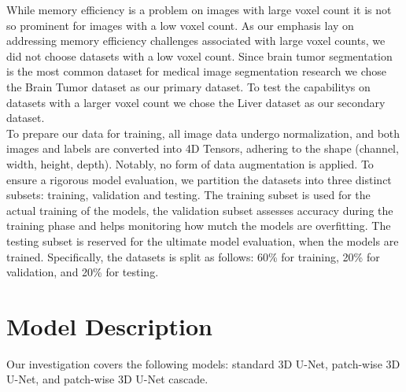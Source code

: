 \noindent While memory efficiency is a problem on images with large voxel count it is not so prominent for images with a low voxel count.
As our emphasis lay on addressing memory efficiency challenges associated with large voxel counts, we did not choose datasets with a low voxel count.
Since brain tumor segmentation is the most common dataset for medical image segmentation research we chose the Brain Tumor dataset as our primary dataset.
To test the capabilitys on datasets with a larger voxel count we chose the Liver dataset as our secondary dataset.\\[1ex]
\noindent To prepare our data for training, all image data undergo normalization, and both images and labels are converted into 4D Tensors, adhering to the shape (channel, width, height, depth).
Notably, no form of data augmentation is applied. To ensure a rigorous model evaluation, we partition the datasets into three distinct subsets: training, validation and testing.
The training subset is used for the actual training of the models, the validation subset assesses accuracy during the training phase and helps monitoring how mutch the models are overfitting.
The testing subset is reserved for the ultimate model evaluation, when the models are trained.
Specifically, the datasets is split as follows: 60\% for training, 20\% for validation, and 20\% for testing.

\section{Model Description}
Our investigation covers the following models: standard 3D U-Net, patch-wise 3D U-Net, and patch-wise 3D U-Net cascade.

